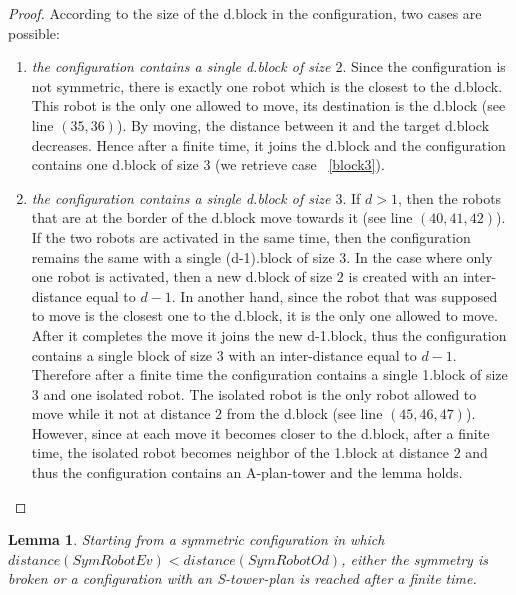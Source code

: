 \documentclass[12pt]{llncs}
\newtheorem{lem}{Lemma}
\begin{document}
\begin{proof}
According to the size of the d.block in the configuration, two cases are possible:
\begin{enumerate} 
\item{\textit{the configuration contains a single d.block of size $2$}}. Since the configuration is not symmetric, there is exactly one robot which is the closest to the d.block. This robot is the only one allowed to move, its destination is the d.block (see line $(35,36)$). By moving, the distance between it and the target d.block decreases. Hence after a finite time, it joins the d.block and the configuration contains one d.block of size $3$ (we retrieve case ~\ref{block3}).
\item\label{block3}{\textit{the configuration contains a single d.block of size $3$}}. If $d>1$, then the robots that are at the border of the d.block move towards it (see line $(40,41,42)$). If the two robots are activated in the same time, then the configuration remains the same with a single (d-1).block of size $3$. In the case where only one robot is activated, then a new d.block of size $2$ is created with an inter-distance equal to $d-1$. In another hand, since the robot that was supposed to move is the closest one to the d.block, it is the only one allowed to move. After it completes the move it joins the new d-1.block, thus the configuration contains a single block of size $3$ with an inter-distance equal to $d-1$. Therefore after a finite time the configuration contains a single 1.block of size $3$ and one isolated robot. The isolated robot is the only robot allowed to move while it not at distance $2$ from the d.block (see line $(45,46,47)$). However, since at each move it becomes closer to the d.block, after a finite time, the isolated robot becomes neighbor of the 1.block at distance $2$ and thus the configuration contains an A-plan-tower and the lemma holds.
\end{enumerate} 
\end{proof}
\begin{lem}
\label{lem:EvsOd}
Starting from a symmetric configuration in which $distance(SymRobotEv)<distance(SymRobotOd)$, either the symmetry is broken or a configuration with an S-tower-plan is reached after a finite time. 
\end{lem}
\end{document}
